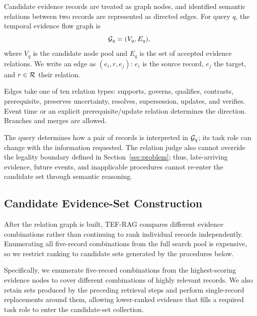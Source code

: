 Candidate evidence records are treated as graph nodes, and identified semantic relations between two records are represented as directed edges. For query $q$, the temporal evidence flow graph is
\begin{equation}
\mathcal{G}_q=(V_q,E_q),
\end{equation}
where $V_q$ is the candidate node pool and $E_q$ is the set of accepted evidence relations. We write an edge as $(e_i,r,e_j)$: $e_i$ is the source record, $e_j$ the target, and $r\in\mathcal{R}$ their relation.

Edges take one of ten relation types: supports, governs, qualifies, contrasts, prerequisite, preserves uncertainty, resolves, supersession, updates, and verifies. Event time or an explicit prerequisite/update relation determines the direction. Branches and merges are allowed.

The query determines how a pair of records is interpreted in $\mathcal{G}_q$; its task role can change with the information requested. The relation judge also cannot override the legality boundary defined in Section~\ref{sec:problem}; thus, late-arriving evidence, future events, and inapplicable procedures cannot re-enter the candidate set through semantic reasoning.

\subsection{Candidate Evidence-Set Construction}

After the relation graph is built, TEF-RAG compares different evidence combinations rather than continuing to rank individual records independently. Enumerating all five-record combinations from the full search pool is expensive, so we restrict ranking to candidate sets generated by the procedures below.

Specifically, we enumerate five-record combinations from the highest-scoring evidence nodes to cover different combinations of highly relevant records. We also retain sets produced by the preceding retrieval steps and perform single-record replacements around them, allowing lower-ranked evidence that fills a required task role to enter the candidate-set collection.

